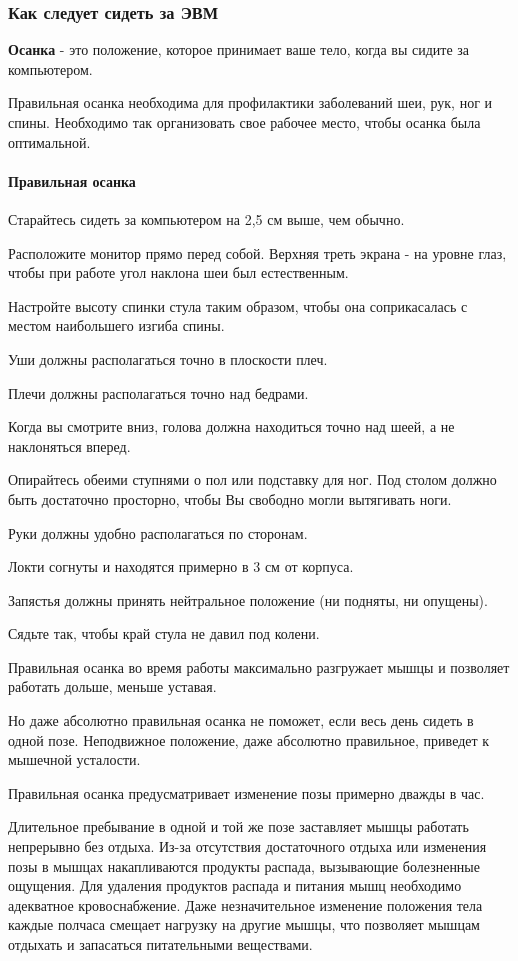 \documentclass[russian,utf8,emptystyle]{eskdtext}
\begin{document}
\begin{spacing}{1.5}
\subsubsection{Как следует сидеть за ЭВМ}

\textbf{Осанка} - это положение, которое принимает ваше тело, когда вы сидите за компьютером.

Правильная осанка необходима для профилактики заболеваний шеи, рук, ног и спины. Необходимо так организовать свое рабочее место, чтобы осанка была оптимальной.

\paragraph{Правильная осанка}
Старайтесь сидеть за компьютером на 2,5 см выше, чем обычно. 

Расположите монитор прямо перед собой. Верхняя треть экрана - на уровне глаз, чтобы при работе угол наклона шеи был естественным. 

Настройте высоту спинки стула таким образом, чтобы она соприкасалась с местом наибольшего изгиба спины. 

Уши должны располагаться точно в плоскости плеч. 

Плечи должны располагаться точно над бедрами. 

Когда вы смотрите вниз, голова должна находиться точно над шеей, а не наклоняться вперед. 

Опирайтесь обеими ступнями о пол или подставку для ног. Под столом должно быть достаточно просторно, чтобы Вы свободно могли вытягивать ноги. 

Руки должны удобно располагаться по сторонам. 

Локти согнуты и находятся примерно в 3 см от корпуса. 

Запястья должны принять нейтральное положение (ни подняты, ни опущены). 

Сядьте так, чтобы край стула не давил под колени. 

Правильная осанка во время работы максимально разгружает мышцы и позволяет работать дольше, меньше уставая. 

Но даже абсолютно правильная осанка не поможет, если весь день сидеть в одной позе. Неподвижное положение, даже абсолютно правильное, приведет к мышечной усталости. 

Правильная осанка предусматривает изменение позы примерно дважды в час. 

Длительное пребывание в одной и той же позе заставляет мышцы работать непрерывно без отдыха. Из-за отсутствия достаточного отдыха или изменения позы в мышцах накапливаются продукты распада, вызывающие болезненные ощущения. Для удаления продуктов распада и питания мышц необходимо адекватное кровоснабжение. Даже незначительное изменение положения тела каждые полчаса смещает нагрузку на другие мышцы, что позволяет мышцам отдыхать и запасаться питательными веществами. 


\end{spacing}
\end{document}
